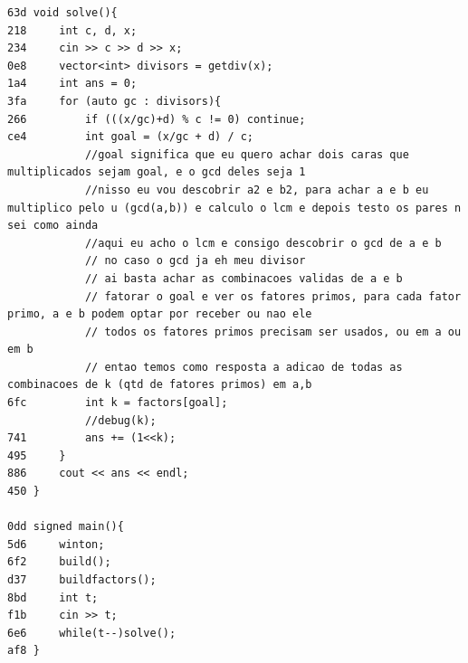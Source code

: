 \documentclass[11pt, a4paper, twoside]{article}
\begin{document}
\begin{lstlisting}
63d void solve(){
218     int c, d, x;
234     cin >> c >> d >> x;
0e8     vector<int> divisors = getdiv(x);
1a4     int ans = 0;
3fa     for (auto gc : divisors){
266         if (((x/gc)+d) % c != 0) continue;
ce4         int goal = (x/gc + d) / c;
            //goal significa que eu quero achar dois caras que multiplicados sejam goal, e o gcd deles seja 1
            //nisso eu vou descobrir a2 e b2, para achar a e b eu multiplico pelo u (gcd(a,b)) e calculo o lcm e depois testo os pares n sei como ainda
            //aqui eu acho o lcm e consigo descobrir o gcd de a e b
            // no caso o gcd ja eh meu divisor
            // ai basta achar as combinacoes validas de a e b
            // fatorar o goal e ver os fatores primos, para cada fator primo, a e b podem optar por receber ou nao ele
            // todos os fatores primos precisam ser usados, ou em a ou em b
            // entao temos como resposta a adicao de todas as combinacoes de k (qtd de fatores primos) em a,b
6fc         int k = factors[goal];
            //debug(k);
741         ans += (1<<k);   
495     }
886     cout << ans << endl;
450 }
 
0dd signed main(){
5d6     winton;
6f2     build();
d37     buildfactors();
8bd     int t;
f1b     cin >> t;
6e6     while(t--)solve();
af8 }
\end{lstlisting}
\end{document}
